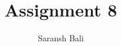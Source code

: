 \documentclass[journal,12pt,twocolumn]{IEEEtran}
\begin{document}
\makeatletter
{}
\makeatother
\let\StandardTheFigure\thefigure
\let\vec\mathbf
\renewcommand{\thefigure}{\theproblem}
\def\putbox#1#2#3{\makebox[0in][l]{\makebox[#1][l]{}\raisebox{\baselineskip}[0in][0in]{\raisebox{#2}[0in][0in]{#3}}}}
     \def\rightbox#1{\makebox[0in][r]{#1}}
     \def\centbox#1{\makebox[0in]{#1}}
     \def\topbox#1{\raisebox{-\baselineskip}[0in][0in]{#1}}
     \def\midbox#1{\raisebox{-0.5\baselineskip}[0in][0in]{#1}}
\vspace{3cm}
\title{Assignment 8}
\author{Saransh Bali}
%
%
%
% 
%
\end{document}
